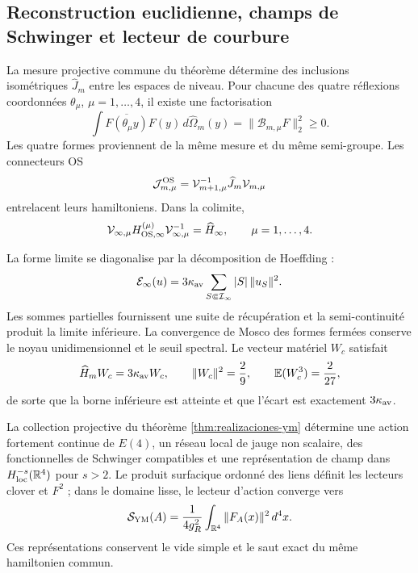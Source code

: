 \subsection*{Reconstruction euclidienne, champs de Schwinger et lecteur de courbure}

La mesure projective commune du théorème détermine des inclusions isométriques
\(\widehat J_m\) entre les espaces de niveau. Pour chacune des quatre
réflexions coordonnées \(\theta_\mu\), \(\mu=1,\ldots,4\), il existe une
factorisation
\begin{equation}\label{eq:amp-ym-cuatro-os}
 \int\overline{F(\theta_\mu y)}F(y)\,
 d\widehat\Omega_m(y)
 =\|\mathcal B_{m,\mu}F\|_2^2\geq0.
\end{equation}
Les quatre formes proviennent de la même mesure et du même semi-groupe. Les
connecteurs OS
\[
 \mathcal J_{m,\mu}^{\rm OS}
 =\mathcal V_{m+1,\mu}^{-1}\widehat J_m\mathcal V_{m,\mu}
\]
entrelacent leurs hamiltoniens. Dans la colimite,
\begin{equation}\label{eq:amp-ym-hamiltoniano-comun}
 \mathcal V_{\infty,\mu}H_{{\rm OS},\infty}^{(\mu)}
 \mathcal V_{\infty,\mu}^{-1}
 =\widehat H_\infty,
 \qquad \mu=1,\ldots,4.
\end{equation}

La forme limite se diagonalise par la décomposition de Hoeffding :
\begin{equation}\label{eq:amp-ym-forma-limite}
 \mathcal E_\infty(u)=3\kappa_{\rm av}
 \sum_{S\Subset\mathcal I_\infty}|S|\,\|u_S\|^2.
\end{equation}
Les sommes partielles fournissent une suite de récupération et la semi-continuité produit la limite inférieure. La convergence de Mosco des formes fermées conserve le noyau unidimensionnel et le seuil spectral. Le vecteur matériel \(W_c\) satisfait
\begin{equation}\label{eq:amp-ym-testigo-gap}
 \widehat H_mW_c=3\kappa_{\rm av}W_c,
 \qquad \|W_c\|^2=\frac29,
 \qquad \mathbb E(W_c^3)=\frac2{27},
\end{equation}
de sorte que la borne inférieure est atteinte et que l’écart est exactement
\(3\kappa_{\rm av}\).

\begin{theorem}
\label{thm:amp-ym-terminacion}
La collection projective du théorème \ref{thm:realizaciones-ym} détermine une action fortement continue de \(E(4)\), un réseau local de jauge non scalaire, des fonctionnelles de Schwinger compatibles et une représentation de champ dans \(H^{-s}_{\rm loc}(\mathbb R^4)\) pour \(s>2\). Le produit surfacique ordonné des liens définit les lecteurs clover et \(F^2\) ; dans le domaine lisse, le lecteur d'action converge vers
\begin{equation}\label{eq:amp-ym-f2}
 \mathcal S_{\rm YM}(A)
 =\frac1{4g_R^2}\int_{\mathbb R^4}\|F_A(x)\|^2\,d^4x.
\end{equation}
Ces représentations conservent le vide simple et le saut exact du même hamiltonien commun.
\end{theorem}

